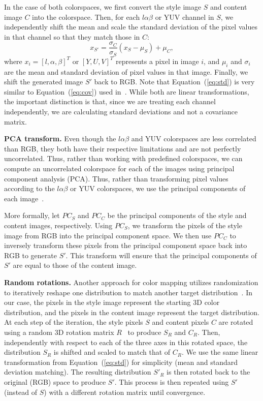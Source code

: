 \documentclass[10pt,twocolumn,letterpaper]{article}
\begin{document}
In the case of both colorspaces, we first convert the style image $S$ and content image $C$ into the colorspace. Then, for each $l\alpha\beta$ or YUV channel in $S$, we independently shift the mean and scale the standard deviation of the pixel values in that channel so that they match those in $C$:
\begin{equation}\label{eq:std}
  x_{S'} = \frac{\sigma_C}{\sigma_S} (x_S - \mu_S) + \mu_C,
\end{equation}
where $x_i = [l, \alpha, \beta]^T$ or $[Y, U, V]^T$ represents a pixel in image $i$, and $\mu_i$ and $\sigma_i$ are the mean and standard deviation of pixel values in that image. Finally, we shift the generated image $S'$ back to RGB. Note that Equation~(\ref{eq:std}) is very similar to Equation~(\ref{eq:cov}) used in~\cite{gatys-color}. While both are linear transformations, the important distinction is that, since we are treating each channel independently, we are calculating standard deviations and not a covariance matrix.

\bigbreak\noindent\textbf{PCA transform.}
Even though the $l\alpha\beta$ and YUV colorspaces are less correlated than RGB, they both have their respective limitations and are not perfectly uncorrelated. Thus, rather than working with predefined colorspaces, we can compute an uncorrelated colorspace for each of the images using principal component analysis (PCA). Thus, rather than transforming pixel values according to the $l\alpha\beta$ or YUV colorspaces, we use the principal components of each image~\cite{pca}.

More formally, let $PC_S$ and $PC_C$ be the principal components of the style and content images, respectively. Using $PC_S$, we transform the pixels of the style image from RGB into the principal component space. We then use $PC_C$ to inversely transform these pixels from the principal component space back into RGB to generate $S'$. This transform will ensure that the principal components of $S'$ are equal to those of the content image.

\bigbreak\noindent\textbf{Random rotations.}
Another approach for color mapping utilizes randomization to iteratively reshape one distribution to match another target distribution~\cite{random}. In our case, the pixels in the style image represent the starting 3D color distribution, and the pixels in the content image represent the target distribution. At each step of the iteration, the style pixels $S$ and content pixels $C$ are rotated using a random 3D rotation matrix $R$~\cite{randrot} to produce $S_R$ and $C_R$. Then, independently with respect to each of the three axes in this rotated space, the distribution $S_R$ is shifted and scaled to match that of $C_R$. We use the same linear transformation from Equation~(\ref{eq:std}) for simplicity (mean and standard deviation matching). The resulting distribution $S'_R$ is then rotated back to the original (RGB) space to produce $S'$. This process is then repeated using $S'$ (instead of $S$) with a different rotation matrix until convergence.
\end{document}
